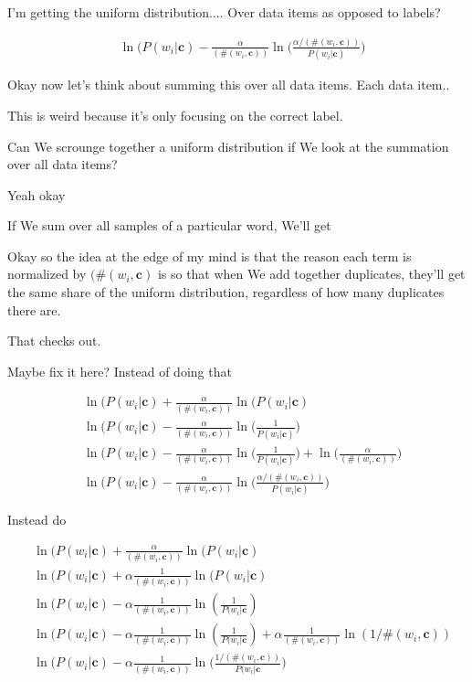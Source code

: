 \documentclass{article}
\newcommand{\context}{\boldsymbol{c}}
\begin{document}
		I'm getting the uniform distribution.... Over data items as opposed to labels? 
		
		\begin{align}
			& \ln(P(w_i|\context) - \frac{\alpha}{(\#(w_i, \context) )}\ln\bigg(\frac{\alpha/(\#(w_i, \context) )}{P(w_i|\context)}\bigg) 
		\end{align}	
		
		Okay now let's think about summing this over all data items. Each data item..
		
		This is weird because it's only focusing on the correct label. 
		
		Can We scrounge together a uniform distribution if We look at the summation over all data items? 
		
		Yeah okay
		
		If We sum over all samples of a particular word, We'll get
		
		Okay so the idea at the edge of my mind is that the reason each term is normalized by $(\#(w_i, \context)$ is so that when We add together duplicates, they'll get the same share of the uniform distribution, regardless of how many duplicates there are. 
		
		That checks out. 
		
		Maybe fix it here? Instead of doing that
		
		\begin{align}
			& \ln(P(w_i|\context) + \frac{\alpha}{(\#(w_i, \context) )}\ln(P(w_i|\context)\\
			& \ln(P(w_i|\context) - \frac{\alpha}{(\#(w_i, \context) )}\ln\bigg(\frac{1}{P(w_i|\context)}\bigg)\\
			& \ln(P(w_i|\context) - \frac{\alpha}{(\#(w_i, \context) )}\ln\bigg(\frac{1}{P(w_i|\context)}\bigg) + \ln\bigg( \frac{\alpha}{(\#(w_i, \context) )} \bigg)\\
			& \ln(P(w_i|\context) - \frac{\alpha}{(\#(w_i, \context) )}\ln\bigg(\frac{\alpha/(\#(w_i, \context) )}{P(w_i|\context)}\bigg) 
		\end{align}	
		
		Instead do
		
		\begin{align}
			& \ln(P(w_i|\context) + \frac{\alpha}{(\#(w_i, \context) )}\ln(P(w_i|\context)	 \\
			& \ln(P(w_i|\context) + \alpha\frac{1}{(\#(w_i, \context) )}\ln(P(w_i|\context)	 \\
			& \ln(P(w_i|\context) - \alpha\frac{1}{(\#(w_i, \context) )}\ln(\frac{1}{P(w_i|\context}) \\
			& \ln(P(w_i|\context) - \alpha\frac{1}{(\#(w_i, \context) )}\ln(\frac{1}{P(w_i|\context}) + \alpha\frac{1}{(\#(w_i, \context) )}\ln(1/\#(w_i, \context)) \\
			& \ln(P(w_i|\context) - \alpha\frac{1}{(\#(w_i, \context) )}\ln\bigg(\frac{1/(\#(w_i, \context) )}{P(w_i|\context}\bigg)
		\end{align}
		
\end{document}
